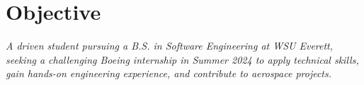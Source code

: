\section{Objective}
\textit{A driven student pursuing a B.S. in Software Engineering at WSU Everett, seeking a challenging Boeing internship in Summer 2024 to apply technical skills, gain hands-on engineering experience, and contribute to aerospace projects. \\}
